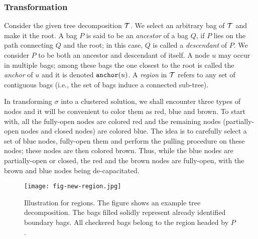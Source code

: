 \documentclass[11pt]{article}
\newcommand{\mypara}[1] {\subsubsection*{#1}}
\newcommand{\anc} {{\tt anchor}}
\newcommand{\calT} {{\cal T}}
\begin{document}
\mypara{\bf Transformation}
Consider the given tree decomposition $\calT$. We select an arbitrary bag of $\calT$ and make it the root.
A bag $P$ is said to be an {\em ancestor} of a bag $Q$, if $P$ lies on the path connecting $Q$ and the root;
in this case, $Q$ is called a {\em descendant} of $P$. We consider $P$ to be both an ancestor and descendant of itself.
A node $u$ may occur in multiple bags; among these bags the one closest to the root is called the {\em anchor}
of $u$ and it is denoted $\anc(u)$.  A {\em region} in $\calT$ refers to any set of contiguous bags 
(i.e., the set of bags induce a connected sub-tree). 

In transforming $\sigma$ into a clustered solution,
we shall encounter three types of nodes and it will be convenient
to color them as red, blue and brown. To start with, 
all the fully-open nodes are colored red and the remaining nodes 
(partially-open nodes and closed nodes) are colored blue.
The idea is to carefully select a set of blue nodes, 
fully-open them and perform the pulling procedure on these nodes; these nodes are then colored brown.
Thus, while the blue nodes are partially-open or closed, the red and the brown nodes
are fully-open, with the brown and blue nodes being de-capacitated.

\begin{figure}[t]
	\centering
\texttt{[image: fig-new-region.jpg]}
\caption{
	Illustration for regions.
	The figure shows an example tree decomposition. The bags filled solidly represent already identified boundary bags.
	All checkered bags belong to the region headed by $P$.
}
\label{fig:region}
\end{figure}
\end{document}
